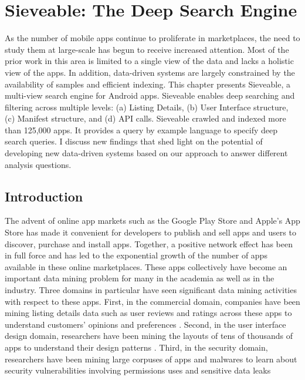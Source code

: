 \chapter{Sieveable: The Deep Search Engine}
\label{ch:sieveable_chapter}
As the number of mobile apps continue to proliferate in marketplaces, the need to study them at large-scale has begun to receive increased attention. 
Most of the prior work in this area is limited to a single view of the data  and lacks a  holistic view of the apps. 
In addition, data-driven systems are largely constrained by the availability of samples and efficient indexing.
This chapter presents Sieveable, a multi-view search engine for Android apps.
Sieveable enables deep searching and filtering across multiple levels: (a) Listing Details, (b) User Interface structure, (c) Manifest structure, and (d) API calls. 
Sieveable crawled and indexed more than 125,000 apps. 
It provides a query by example language to specify deep search queries. 
I discuss new findings that shed light on the potential of developing new data-driven systems based on our approach to answer different analysis questions.

\section{Introduction}

The advent of online app markets such as the Google Play Store and Apple's App Store has made it convenient for developers to publish and sell apps and users to discover, purchase and install apps. 
Together, a positive network effect has been in full force and has led to the exponential growth of the number of apps available in these online marketplaces.
These apps collectively have become an important data mining problem for many in the academia as well as in the industry.
Three domains in particular have seen significant data mining activities with respect to these apps.
First, in the commercial domain, companies have been mining listing details data such as user reviews and ratings across these apps to understand customers' opinions and preferences \cite{appbrain,apptrace}.
Second, in the user interface design domain, researchers have been mining the layouts of tens of thousands of apps to understand their design patterns \cite{Alharbi_2015_MobileHCI}.
Third, in the security domain, researchers have been mining large corpuses of apps and malwares to learn about security vulnerabilities involving permissions uses \cite{zhou_2012_SP_dissecting} and sensitive data leaks \cite{Arzt_2014_PLDI}

